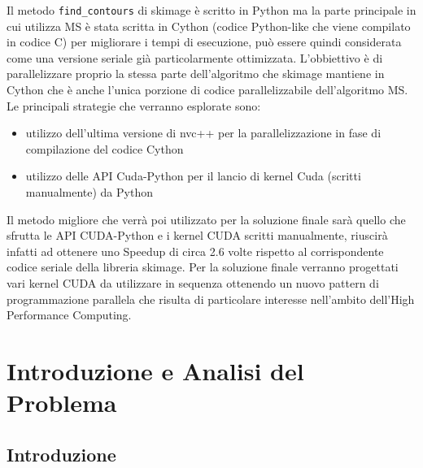 \documentclass[12pt,a4paper]{report}
\begin{document}
Il metodo \verb|find_contours| di skimage è scritto in Python ma la parte principale in cui utilizza MS è stata scritta in Cython (codice Python-like che viene compilato in codice C) per migliorare i tempi di esecuzione, può essere quindi considerata come una versione seriale già particolarmente ottimizzata. \newline L'obbiettivo è di parallelizzare proprio la stessa parte dell'algoritmo che skimage mantiene in Cython che è anche l'unica porzione di codice parallelizzabile dell'algoritmo MS. \newline
Le principali strategie che verranno esplorate sono:
\begin{itemize}
\item utilizzo dell'ultima versione di nvc++ per la parallelizzazione in fase di compilazione del codice Cython
\item utilizzo delle API Cuda-Python per il lancio di kernel Cuda (scritti manualmente) da Python 
\end{itemize}
Il metodo migliore che verrà poi utilizzato per la soluzione finale sarà quello che sfrutta le API CUDA-Python e i kernel CUDA scritti manualmente, riuscirà infatti ad ottenere uno Speedup di circa 2.6 volte rispetto al corrispondente codice seriale della libreria skimage. \newline
Per la soluzione finale verranno progettati vari kernel CUDA da utilizzare in sequenza ottenendo un nuovo pattern di programmazione parallela che risulta di particolare interesse nell'ambito dell'High Performance Computing.



\chapter{Introduzione e Analisi del Problema}
\section{Introduzione}
\end{document}

